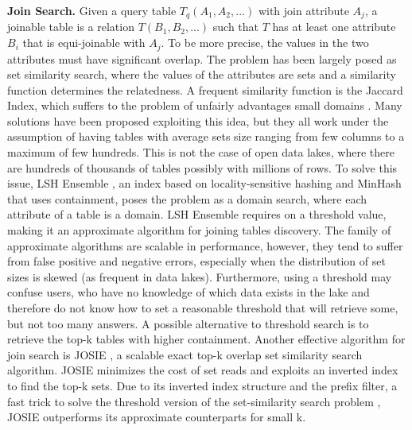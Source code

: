 \textbf{Join Search.} Given a query table $T_q(A_1,A_2,...)$ with join attribute $A_j$, a joinable table is a relation $T(B_1, B_2,...)$ such that $T$ has at least one attribute $B_i$ that is equi-joinable with $A_j$. To be more precise, the values in the two attributes must have significant overlap. The problem has been largely posed as set similarity search, where the values of the attributes are sets and a similarity function determines the relatedness. A frequent similarity function is the Jaccard Index, which suffers to the problem of unfairly advantages small domains \cite{zhu2016lsh}. Many solutions have been proposed exploiting this idea, but they all work under the assumption of having tables with average sets size ranging from few columns to a maximum of few hundreds. This is not the case of open data lakes, where there are hundreds of thousands of tables possibly with millions of rows. To solve this issue,  LSH Ensemble \cite{zhu2016lsh}, an index based on locality-sensitive hashing \cite{gionis1999similarity} and MinHash \cite{indyk1998approximate} that uses containment, poses the problem as a domain search, where each attribute of a table is a domain. LSH Ensemble requires on a threshold value, making it an approximate algorithm for joining tables discovery. The family of approximate algorithms are scalable in performance, however, they tend to suffer from false positive and negative errors, especially when the distribution of set sizes is skewed (as frequent in data lakes). Furthermore, using a threshold may confuse users, who have no knowledge of which data exists in the lake and therefore do not know how to set a reasonable threshold that will retrieve some, but not too many answers. A possible alternative to threshold search is to retrieve the top-k tables with higher containment. Another effective algorithm for join search is JOSIE \cite{zhu2019josie}, a scalable exact top-k overlap set similarity search algorithm. JOSIE minimizes the cost of set reads and exploits an inverted index to find the top-k sets. Due to its inverted index structure and the prefix filter, a fast trick to solve the threshold version of the set-similarity search problem \cite{chaudhuri2006primitive}, JOSIE outperforms its approximate counterparts for small k.
\bigbreak

